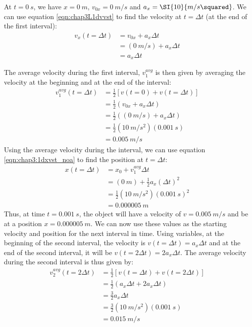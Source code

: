 At $t=\SI{0}{s}$, we have $x=\SI{0}{m}$, $v_{0x}=\SI{0}{m/s}$ and $a_x=\SI{10}{m/s\squared}$. We can use equation \ref{eqn:chap3L1dvvst} to find the velocity at $t=\Delta t$ (at the end of the first interval):
\begin{align*}
v_x(t=\Delta t) &= v_{0x} + a_x\Delta t\\
&=(\SI{0}{m/s})+ a_x\Delta t\\&=a_x\Delta t
\end{align*}

The average velocity during the first interval, $v_1^{avg}$ is then given by averaging the velocity at the beginning and at the end of the interval:
\begin{align*}
v_1^{avg}(t=\Delta t)&=\frac{1}{2}\left[ v(t=0) + v(t=\Delta t)\right]\\
&=\frac{1}{2}\left(v_{0x}+a_x\Delta t\right)\\
&=\frac{1}{2}\left((\SI{0}{m/s})+a_x\Delta t\right)\\
&=\frac{1}{2}(\SI{10}{m/s^2})(\SI{0.001}{s})\\
&=\SI{0.005}{m/s}
\end{align*}
Using the average velocity during the interval, we can use equation \ref{eqn:chap3:1dxvst_noa} to find the position at $t=\Delta t$: 
\begin{align*}
x(t=\Delta t) &= x_0 +v_1^{avg}\Delta t\\
&=(\SI{0}{m}) + \frac{1}{2}a_x(\Delta t)^2\\
&= \frac{1}{2}(\SI{10}{m/s^2})(\SI{0.001}{s})^2\\
&=\SI{0.000005}{m}
\end{align*}
Thus, at time $t=\SI{0.001}{s}$, the object will have a velocity of $v=\SI{0.005}{m/s}$ and be at a position $x=\SI{0.000005}{m}$. We can now use these values as the starting velocity and position for the next interval in time. Using variables, at the beginning of the second interval, the velocity is $v(t=\Delta t)=a_x\Delta t$ and at the end of the second interval, it will be $v(t=2\Delta t)=2a_x\Delta t$. The average velocity during the second interval is thus given by:
\begin{align*}
v_2^{avg}(t=2\Delta t)&= \frac{1}{2}\left[v(t=\Delta t)+v(t=2\Delta t) \right]\\
&=\frac{1}{2}(a_x\Delta t+2a_x\Delta t)\\
&=\frac{3}{2}a_x\Delta t\\
&=\frac{3}{2}(\SI{10}{m/s^2})(\SI{0.001}{s})\\
&=\SI{0.015}{m/s}
\end{align*}
